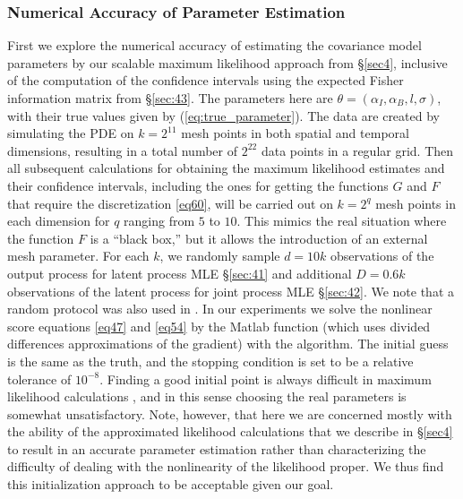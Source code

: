 \documentclass[article,ij4uq]{ij4uq}              %
\begin{document}
\subsubsection{Numerical Accuracy of Parameter Estimation}\label{sec:511}
\par First we explore the numerical accuracy of estimating the covariance model parameters by our scalable maximum likelihood approach from \S \ref{sec4}, inclusive of the computation of the confidence intervals using the expected Fisher information matrix from \S \ref{sec:43}. 
The parameters here are $\theta=(\alpha_{I},\alpha_B,l,\sigma)$, with their true values given by (\ref{eq:true_parameter}). The data are created by simulating the PDE on  $k=2^{11}$ mesh points in both spatial and temporal dimensions,  resulting in a total number of $2^{22}$ data points in a regular grid. Then all subsequent calculations for obtaining the maximum likelihood estimates and their confidence intervals, including the ones for getting the functions $G$ and $F$ that require the discretization \eqref{eq60}, will be carried out on $k=2^q$ mesh points in each dimension for $q$ ranging from $5$ to $10$. This mimics the real situation where the function $F$ is a ``black box,'' but it allows the introduction of an external mesh parameter. For each $k$, we randomly sample $d=10k$ observations of the output process for latent process MLE \S \ref{sec:41} and additional $D=0.6k$ observations of the latent process for joint process MLE \S \ref{sec:42}. We note that a random protocol was also used in \cite{CovModel}. In our experiments we solve the nonlinear score equations \eqref{eq47} and \eqref{eq54} by the Matlab  function (which uses divided differences approximations of the gradient) with the  algorithm. The initial guess is the same as the truth, and the stopping condition is set to be a relative tolerance of $10^{-8}$. Finding a good initial point is always difficult in maximum likelihood calculations \cite{stein2013stochastic}, and in this sense choosing the real parameters is somewhat unsatisfactory. Note, however, that here we are  concerned mostly with the ability of the approximated likelihood calculations that we describe in \S \ref{sec4} to result in an accurate parameter estimation rather than characterizing the difficulty of dealing with the nonlinearity of the likelihood proper. We thus find this initialization approach to be acceptable given our goal. 
\end{document}
